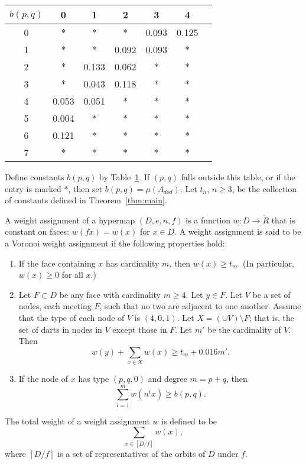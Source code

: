\documentclass{article} %
\begin{document}
\begin{centering}
\begin{table}
\label{vertexTable}
\begin{tabular}{|c|c|c|c|c|c|c|} 
\hline
$b(p,q)$ & 0 & 1 & 2 & 3 & 4 \\
\hline
0 & * & * & * & 0.093 & 0.125  \\
1 & * & * & 0.092 & 0.093 & *  \\
2 & * & 0.133 & 0.062 & * & *  \\
3 & * & 0.043 & 0.118 & * & *  \\
4 & 0.053 & 0.051 & * & * & *  \\
5 & 0.004 & * & * & * & *  \\
6 & 0.121 & * & * & * & * \\
7 & * & * & * & * & * \\
\hline
\end{tabular}
\end{table}
\end{centering}

Define constants $b(p,q)$ by Table~\ref{vertexTable}.
If $(p,q)$ falls outside this table, or if the entry is marked $*$, then
set $b(p,q)=\mu(\Lambda_{dod})$.
Let $t_n$, $n\ge3$, be the collection of constants defined in Theorem~\ref{thm:main}.

A weight assignment of a hypermap $(D,e,n,f)$ is a function $w:D \to \ring{R}$ that
is constant on faces: $w(f x) = w(x)$ for $x\in D$.  A weight assignment is said to be a Voronoi weight assignment
if the following properties hold:
\begin{enumerate}
\item If the face containing $x$ has cardinality $m$, then $w(x)\ge t_m$.
(In particular, $w(x)\ge0$ for all $x$.)
\item Let $F\subset D$ 
be any face with cardinality $m \ge 4$.  Let $y\in F$.
Let $V$ be a set of nodes, each meeting $F$, such
that no two are adjacent to one another.  
Assume that the type of each node of $V$ is $(4,0,1)$.
Let $X =(\cup V)\setminus F$;
that is, the set of darts in nodes in $V$ except those in $F$.
Let $m'$ be the cardinality of $V$.
Then
$$
w(y) + \sum_{x\in X} w(x) \ge t_m  +  0.016 m'.
$$
\item If the node of $x$ has type $(p,q,0)$ and degree $m=p+q$, then
  $$
  \sum_{i=1}^m w(n^i x) \ge b(p,q).
  $$
\end{enumerate}
The total weight of a weight assignment $w$ is defined to be
$$
\sum_{x\in [D/f]}  w(x),
$$
where $[D/f]$ is a set of representatives of the orbits of $D$ under $f$.
\end{document}
